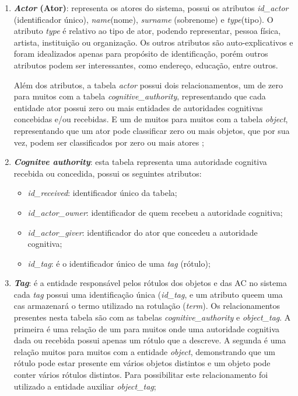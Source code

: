 \begin{enumerate}
    \item \textbf{\emph{Actor} (Ator)}: representa os atores do sistema, possui os atributos \emph{id\_actor} (identificador único), \emph{name}(nome), \emph{surname} (sobrenome) e \emph{type}(tipo). O atributo \emph{type} é relativo ao tipo de ator, podendo representar, pessoa física, artista, instituição ou organização. Os outros atributos são auto-explicativos e foram idealizados apenas para propósito de identificação, porém outros atributos podem ser interessantes, como endereço, educação, entre outros. 
    
    Além dos atributos, a tabela \emph{actor} possui dois relacionamentos, um de zero para muitos com a tabela \emph{cognitive\_authority}, representando que cada entidade ator possui zero ou mais entidades de autoridades cognitivas concebidas e/ou recebidas. E um de muitos para muitos com a tabela \emph{object}, representando que um ator pode classificar zero ou mais objetos, que por sua vez, podem ser classificados por zero ou mais atores ;
    
    \item \textbf{\emph{Cognitve authority}}: esta tabela representa uma autoridade cognitiva recebida ou concedida, possui os seguintes atributos: 
    \begin{itemize}
        \item \emph{id\_received}: identificador único da tabela;
        \item \emph{id\_actor\_owner}: identificador de quem recebeu a autoridade cognitiva;
        \item \emph{id\_actor\_giver}: identificador do ator que concedeu a autoridade cognitiva; 
        \item \emph{id\_tag}: é o identificador único de uma \emph{tag} (rótulo); 
    \end{itemize}
    
    \item \textbf{\emph{Tag}}: é a entidade responsável pelos rótulos dos objetos e das AC no sistema cada \emph{tag} possui uma identificação única (\emph{id\_tag}, e um atributo queem uma cas armazenará o termo utilizado na rotulação (\emph{term}). Os relacionamentos presentes nesta tabela são com as tabelas  \emph{cognitive\_authority} e \emph{object\_tag}. A primeira é uma relação de um para muitos onde uma autoridade cognitiva dada ou recebida possui apenas um rótulo que a descreve. A segunda é uma relação muitos para muitos com a entidade \emph{object}, demonstrando que um rótulo pode estar presente em vários objetos distintos e um objeto pode conter vários rótulos distintos. Para possibilitar este relacionamento foi utilizado a entidade auxiliar \emph{object\_tag};
    

\end{enumerate}
